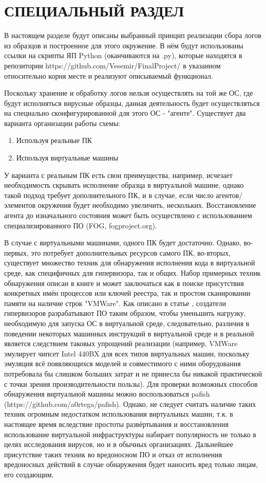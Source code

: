 \section {СПЕЦИАЛЬНЫЙ РАЗДЕЛ}
В настоящем разделе будут описаны выбранный принцип реализации сбора логов из образцов и построенное для этого окружение. В нём будут использованы ссылки на скрипты ЯП Python (оканчиваются на .py), которые находятся в репозитории https://github.com/Vesemir/FinalProject/  в указанном относительно корня месте и реализуют описываемый функционал.

Поскольку хранение и обработку логов нельзя осуществлять на той же ОС, где будут исполняться вирусные образцы, данная деятельность будет осуществляться на специально сконфигурированной для этого ОС - "агенте". Существует два варианта организации работы схемы:
\begin {enumerate}
	\item Используя реальные ПК
	\item Используя виртуальные машины
\end {enumerate}
У варианта с реальным ПК есть свои преимущества, например, исчезает необходимость скрывать исполнение
образца в виртуальной машине, однако такой подход требует дополнительного ПК, и в случае,
если число агентов/ элементов окружения будет необходимо увеличить, нескольких. Восстановление агента
до изначального состояния может быть осуществлено с использованием специализированного ПО (FOG, fogproject.org).

В случае с виртуальными машинами, одного ПК будет достаточно. Однако, во-первых, это потребует дополнительных ресурсов самого ПК, во-вторых, существует множество техник для обнаружения исполнения кода в виртуальной среде, как специфичных для гипервизора, так и общих. Набор примерных техник обнаружения описан в  книге \cite{MALWAREANALYSIS} и может заключаться как в поиске присутствия конкретных имён процессов или ключей реестра, так и простом сканировании памяти на наличие строк "VMWare".  Как описано в статье \cite {VMMYTHS}, создатели гипервизоров разрабатывают ПО таким образом, чтобы уменьшить нагрузку,  необходимую для запуска ОС в виртуальной среде, следовательно, различия в поведении некоторых машинных инструкций в виртуальной среде и в реальной является следствием таковых упрощений реализации (например, VMWare эмулирует чипсет Intel 440BX для всех типов виртуальных машин, поскольку эмуляция всё появляющихся моделей и совместимого с ними оборудования потребовала бы слишком больших затрат и не принесла бы никакой практической с точки зрения производительности пользы). Для проверки возможных способов обнаружения виртуальной машины можно воспользоваться pafish (https://github.com/a0rtega/pafish). Однако, не следует считать наличие таких техник огромным недостатком использования виртуальных машин, т.к. в настоящее время вследствие простоты развёртывания и восстановления использование виртуальной инфраструктуры набирает популярность не только в целях исследования вирусов, но и в обычных организациях. Дальнейшее присутствие таких техник во вредоносном ПО и отказ от исполнения вредоносных действий в случае обнаружения будет наносить вред только лицам, его создающим.

